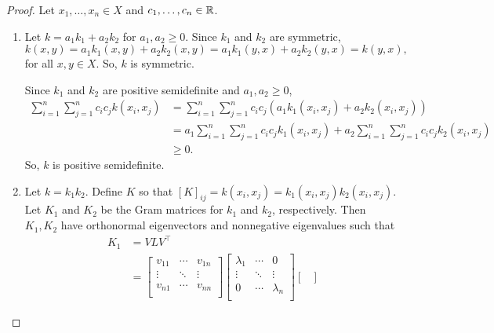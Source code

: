 \begin{proof}
    Let \(x_1, \dots, x_n \in X\) and \(c_1, \dots, c_n \in \mathbb{R}\).
    \begin{enumerate}
        \item \label{itm:kernel-linear-combo}
        Let \(k = a_1k_1 + a_2k_2\) for \(a_1, a_2 \geq 0\).
        Since \(k_1\) and \(k_2\) are symmetric,
        \[
            k(x,y)
            = a_1k_1(x,y) + a_2k_2(x,y)
            = a_1k_1(y,x) + a_2k_2(y,x)
            = k(y,x),
        \]
        for all \(x,y \in X\).
        So, \(k\) is symmetric.

        Since \(k_1\) and \(k_2\) are positive semidefinite and \(a_1, a_2 \geq 0\),
        \begin{align*}
            \sum_{i=1}^{n} \sum_{j=1}^{n} c_i c_j k(x_i,x_j)
            &= \sum_{i=1}^{n} \sum_{j=1}^{n} c_i c_j (a_1 k_1(x_i,x_j) + a_2 k_2(x_i,x_j))\\
            &= a_1 \sum_{i=1}^{n} \sum_{j=1}^{n} c_i c_j k_1(x_i,x_j)
            + a_2 \sum_{i=1}^{n} \sum_{j=1}^{n} c_i c_j k_2(x_i,x_j)\\
            &\geq 0.
        \end{align*}
        So, \(k\) is positive semidefinite.
        \item \label{itm:kernel-product}
        Let \(k = k_1 k_2\).
        Define \(K\) so that \([K]_{ij} = k(x_i,x_j) = k_1(x_i, x_j) k_2(x_i, x_j)\).
        Let \(K_1\) and \(K_2\) be the Gram matrices for \(k_1\) and \(k_2\), respectively.
        Then \(K_1, K_2\) have orthonormal eigenvectors and nonnegative eigenvalues such that
        \def\dsum{\displaystyle\sum}
        \begin{align*}
            K_1 &= V LV^\top \\
            &= \begin{bmatrix}
                v_{11} & \cdots & v_{1n}\\
                \vdots & \ddots & \vdots\\
                v_{n1} & \cdots & v_{nn}\\
            \end{bmatrix}
            \begin{bmatrix}
                \lambda_{1} & \cdots & 0\\
                \vdots & \ddots & \vdots\\
                0 & \cdots & \lambda_{n}\\
            \end{bmatrix}
            \begin{bmatrix}

\end{bmatrix}
\end{align*}
\end{enumerate}
\end{proof}
